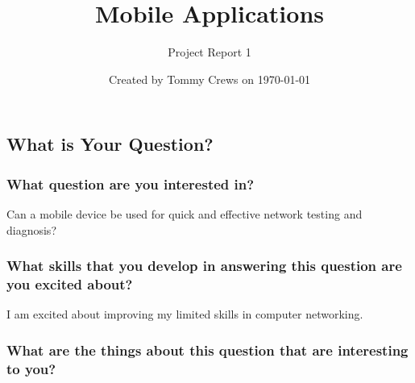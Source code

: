 \documentclass[letterpaper]{article}            %
\title{Mobile Applications}                     %
\author{Project Report 1}                       %
\date{Created by Tommy Crews on \today}         %
\begin{document}
\newcommand{\code}[1]{\texttt{#1}}              %

\setcounter{section}{1}							%

\maketitle                                      %



%
%




\subsection{What is Your Question?}

\subsubsection{What question are you interested in?}

Can a mobile device be used for quick and effective network testing and diagnosis?

\subsubsection{What skills that you develop in answering this question are you excited about?}

I am excited about improving my limited skills in computer networking.

\subsubsection{What are the things about this question that are interesting to you?}
\end{document}
